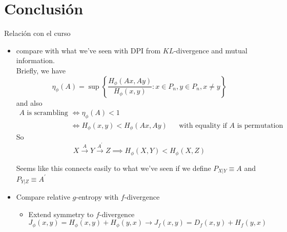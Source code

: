 \section{Conclusión}
Relación con el curso
\begin{itemize}
    \item compare with what we've seen with DPI from $KL$-divergence and mutual information. \\ Briefly, we have
    \[\eta_{\phi}(A) = \sup \left\{\frac{H_{\phi}(Ax,Ay)}{H_{\phi}(x,y)}: x\in P_n, y\in P_n, x \neq y\right\}\]
    and also
    \begin{align*}
        A \text{ is scrambling } &\iff \eta_{\phi}(A) < 1 \\
        &\iff H_{\phi}(x,y) < H_{\phi}(Ax,Ay) &&\text{with equality if $A$ is permutation}
    \end{align*}
    So 
    \[X \xrightarrow{A} Y \xrightarrow{A^\prime} Z \implies H_{\phi}(X,Y) < H_{\phi}(X,Z)\]
    
    Seems like this connects easily to what we've seen if we define $P_{X|Y} \equiv A$ and $P_{Y|Z} \equiv A^\prime$
    \item Compare relative $g$-entropy with $f$-divergence
    \begin{itemize}
        \item Extend symmetry to $f$-divergence
        \[J_{\phi}(x,y) = H_{\phi}(x,y) + H_{\phi}(y,x) \longrightarrow J_{f}(x,y) = D_f(x,y) + H_f(y,x)\]
    \end{itemize}
\end{itemize}

